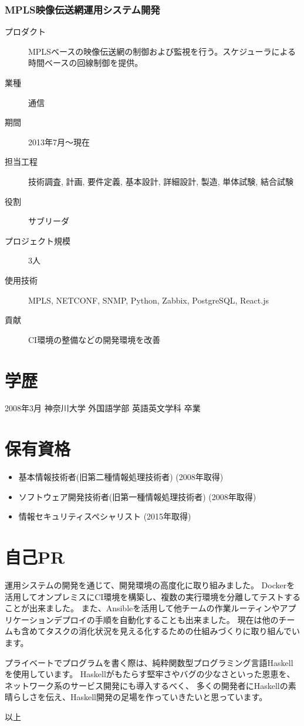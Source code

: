 \documentclass[9pt]{jsarticle}
\begin{document}
\subsubsection{MPLS映像伝送網運用システム開発}

\begin{description}
    \item[プロダクト] MPLSベースの映像伝送網の制御および監視を行う。スケジューラによる時間ベースの回線制御を提供。
    \item[業種] 通信
    \item[期間] 2013年7月〜現在
    \item[担当工程] 技術調査, 計画, 要件定義, 基本設計, 詳細設計, 製造, 単体試験, 結合試験
    \item[役割] サブリーダ
    \item[プロジェクト規模] 3人
    \item[使用技術] MPLS, NETCONF, SNMP, Python, Zabbix, PostgreSQL, React.js
    \item[貢献] CI環境の整備などの開発環境を改善
\end{description}

\section{学歴}

2008年3月 神奈川大学 外国語学部 英語英文学科 卒業

\section{保有資格}

\begin{itemize}
  \item 基本情報技術者(旧第二種情報処理技術者) (2008年取得)
  \item ソフトウェア開発技術者(旧第一種情報処理技術者) (2008年取得)
  \item 情報セキュリティスペシャリスト (2015年取得)
\end{itemize}

\section{自己PR}

運用システムの開発を通じて、開発環境の高度化に取り組みました。
Dockerを活用してオンプレミスにCI環境を構築し、複数の実行環境を分離してテストすることが出来ました。
また、Ansibleを活用して他チームの作業ルーティンやアプリケーションデプロイの手順を自動化することも出来ました。
現在は他のチームも含めてタスクの消化状況を見える化するための仕組みづくりに取り組んでいます。

プライベートでプログラムを書く際は、純粋関数型プログラミング言語Haskellを使用しています。
Haskellがもたらす堅牢さやバグの少なさといった恩恵を、ネットワーク系のサービス開発にも導入するべく、
多くの開発者にHaskellの素晴らしさを伝え、Haskell開発の足場を作っていきたいと思っています。

\begin{flushright}
  以上
\end{flushright}
\end{document}
